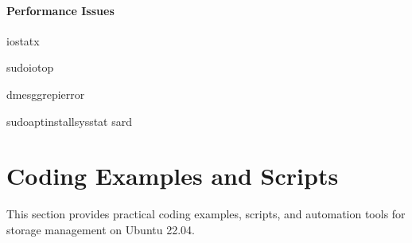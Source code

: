 \documentclass[letterpaper,10pt,english]{sphinxmanual}
\begin{document}
\subsubsection{Performance Issues}
\label{\detokenize{ubuntu-setup:performance-issues}}
\begin{sphinxVerbatim}[commandchars=\\\{\}]
iostat\PYGZhy{}x

sudoiotop

dmesggrep\PYGZhy{}ierror

sudoaptinstallsysstat
sar\PYGZhy{}d
\end{sphinxVerbatim}

\sphinxstepscope


\chapter{Coding Examples and Scripts}
\label{\detokenize{coding-examples:coding-examples-and-scripts}}\label{\detokenize{coding-examples::doc}}
\sphinxAtStartPar
This section provides practical coding examples, scripts, and automation tools for storage management on Ubuntu 22.04.
\end{document}
